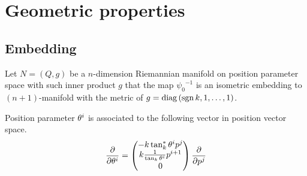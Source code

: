 \documentclass[../main.tex]{subfiles}
\begin{document}
\section{Geometric properties}
\subsection{Embedding}
\begin{definition}\label{M:Embedding}
    Let $N=\left(Q,g\right)$ be a $n$-dimension Riemannian manifold
    on position parameter space with such inner product $g$ that
    the map ${\psi_0}^{-1}$
    is an isometric embedding to $\left(n+1\right)$-manifold
    with the metric of $g=\operatorname{diag}{\left(\operatorname{sgn}{k},1,\dots,1\right)}$.
\end{definition}
\begin{lemma}\label{M:Tangent:Basis}
    Position parameter $\tensor{\theta}{^i}$ is associated to the following vector in position vector space.
    \begin{equation*}
        \frac{\partial}{\partial\tensor{\theta}{^i}} =
        \begin{pmatrix}
            -k\tan_k^\ast\tensor{\theta}{^i}\tensor{p}{^j}         \\
            k\frac{1}{\tan_k\tensor{\theta}{^i}}\tensor{p}{^{i+1}} \\
            0
        \end{pmatrix} \frac{\partial}{\partial\tensor{p}{^j}}
    \end{equation*}
\end{lemma}
\end{document}
